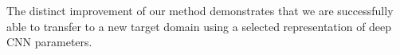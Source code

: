 



The distinct improvement of our method demonstrates that we are successfully able to transfer to a new target domain using a selected representation of deep CNN parameters.


%
%





